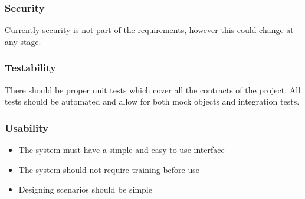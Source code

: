 \documentclass[a4paper,12pt]{article}
\begin{document}
\subsubsection{Security}
Currently security is not part of the requirements, however this could change at any stage.



\subsubsection{Testability}
There should be proper unit tests which cover all the contracts of the project. All tests should be automated and allow for both mock objects and integration tests.

\subsubsection{Usability}
	\begin{itemize}
		\item The system must have a simple and easy to use interface
		\item The system should not require training before use
		\item Designing scenarios should be simple
	\end{itemize}





\end{document}
